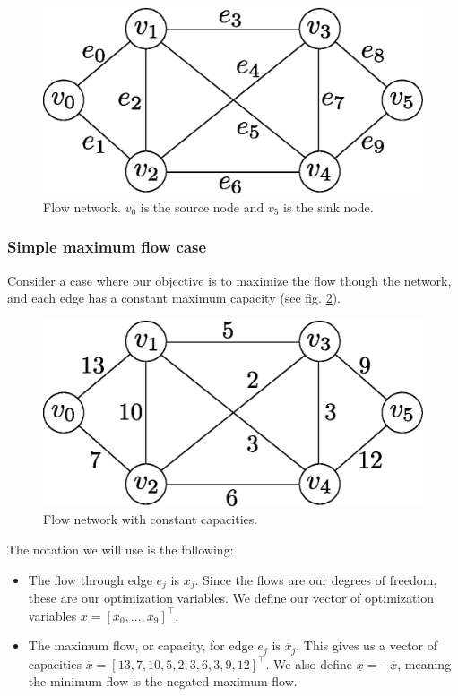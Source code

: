 \begin{figure}[H]
\centering
\includegraphics[scale=0.6]{figures/flownetwork.eps}
\caption{Flow network. $v_0$ is the source node and $v_5$ is the sink node.}
\label{fig:flownetwork}
\end{figure}

\subsubsection{Simple maximum flow case} \label{sec:maxflow}
Consider a case where our objective is to maximize the flow though the network, and each edge has a constant maximum capacity (see fig. \ref{fig:flownetwork_capacity}).

\begin{figure}[H]
\centering
\includegraphics[scale=0.6]{figures/flownetwork_capacity.eps}
\caption{Flow network with constant capacities.}
\label{fig:flownetwork_capacity}
\end{figure}

The notation we will use is the following:
\begin{itemize}
\item
The flow through edge $e_j$ is $x_j$. Since the flows are our degrees of freedom, these are our optimization variables. We define our vector of optimization variables $x = [x_0, \dots, x_9]^\top$.
\item
The maximum flow, or capacity, for edge $e_j$ is $\overline{x}_j$. This gives us a vector of capacities $\overline{x} = [13, 7, 10, 5, 2, 3, 6, 3, 9, 12]^\top$. We also define $\underline{x} = -\overline{x}$, meaning the minimum flow is the negated maximum flow.
\end{itemize}

